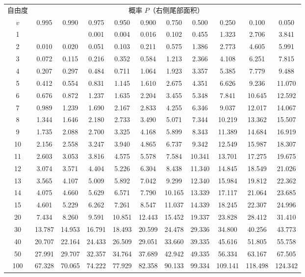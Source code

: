 \documentclass[lang=cn,10pt]{elegantbook}
\begin{document}
\begin{longtable}{c|cccccccccc}
    \hline
    自由度 & \multicolumn{10}{c}{概率 $P$（右侧尾部面积）} \\
    $v$ & 0.995 & 0.990 & 0.975 & 0.950 & 0.900 & 0.750 & 0.500 & 0.250 & 0.100 & 0.050 \\
    \hline
    \endhead
    1 & & & 0.001 & 0.004 & 0.016 & 0.102 & 0.455 & 1.323 & 2.706 & 3.841 \\
    2 & 0.010 & 0.020 & 0.051 & 0.103 & 0.211 & 0.575 & 1.386 & 2.773 & 4.605 & 5.991 \\
    3 & 0.072 & 0.115 & 0.216 & 0.352 & 0.584 & 1.213 & 2.366 & 4.108 & 6.251 & 7.815 \\
    4 & 0.207 & 0.297 & 0.484 & 0.711 & 1.064 & 1.923 & 3.357 & 5.385 & 7.779 & 9.488 \\
    5 & 0.412 & 0.554 & 0.831 & 1.145 & 1.610 & 2.675 & 4.351 & 6.626 & 9.236 & 11.070 \\
    6 & 0.676 & 0.872 & 1.237 & 1.635 & 2.204 & 3.455 & 5.348 & 7.841 & 10.645 & 12.592 \\
    7 & 0.989 & 1.239 & 1.690 & 2.167 & 2.833 & 4.255 & 6.346 & 9.037 & 12.017 & 14.067 \\
    8 & 1.344 & 1.646 & 2.180 & 2.733 & 3.490 & 5.071 & 7.344 & 10.219 & 13.362 & 15.507 \\
    9 & 1.735 & 2.088 & 2.700 & 3.325 & 4.168 & 5.899 & 8.343 & 11.389 & 14.684 & 16.919 \\
    10 & 2.156 & 2.558 & 3.247 & 3.940 & 4.865 & 6.737 & 9.342 & 12.549 & 15.987 & 18.307 \\
    11 & 2.603 & 3.053 & 3.816 & 4.575 & 5.578 & 7.584 & 10.341 & 13.701 & 17.275 & 19.675 \\
    12 & 3.074 & 3.571 & 4.404 & 5.226 & 6.304 & 8.438 & 11.340 & 14.845 & 18.549 & 21.026 \\
    13 & 3.565 & 4.107 & 5.009 & 5.892 & 7.042 & 9.299 & 12.340 & 15.984 & 19.812 & 22.362 \\
    14 & 4.075 & 4.660 & 5.629 & 6.571 & 7.790 & 10.165 & 13.339 & 17.117 & 21.064 & 23.685 \\
    15 & 4.601 & 5.229 & 6.262 & 7.261 & 8.547 & 11.037 & 14.339 & 18.245 & 22.307 & 24.996 \\
    20 & 7.434 & 8.260 & 9.591 & 10.851 & 12.443 & 15.452 & 19.337 & 23.828 & 28.412 & 31.410 \\
    30 & 13.787 & 14.953 & 16.791 & 18.493 & 20.599 & 24.478 & 29.336 & 34.800 & 40.256 & 43.773 \\
    40 & 20.707 & 22.164 & 24.433 & 26.509 & 29.051 & 33.660 & 39.335 & 45.616 & 51.805 & 55.758 \\
    50 & 27.991 & 29.707 & 32.357 & 34.764 & 37.689 & 42.942 & 49.335 & 56.334 & 63.167 & 67.505 \\
    100 & 67.328 & 70.065 & 74.222 & 77.929 & 82.358 & 90.133 & 99.334 & 109.141 & 118.498 & 124.342 \\
    \hline
\end{longtable}
\end{document}
